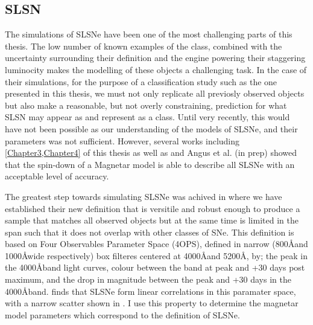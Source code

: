 \subsection{SLSN}
The simulations of SLSNe have been one of the most challenging parts of this thesis. The low number of known examples of the class, combined with the uncertainty surrounding their definition and the engine powering their staggering luminocity makes the modelling of these objects a challenging task. In the case of their simulations, for the purpose of a classification study such as the one presented in this thesis, we must not only replicate all previosly observed objects but also make a reasonable, but not overly constraining, prediction for what SLSN may appear as and represent as a class. Until very recently, this would have not been possible as our understanding of the models of SLSNe, and their parameters was not sufficient. However, several works including \cref{Chapter3,Chapter4} of this thesis as well as \citet{Inserra2013,Nicoll2013,Nicoll2017} and Angus et al. (in prep) showed that the spin-down of a Magnetar model is able to describe all SLSNe with an acceptable level of accuracy.

The greatest step towards simulating SLSNe was achived in \citet{Inserra2018a} where we have established their new definition that is versitile and robust enough to produce a sample that matches all observed objects but at the same time is limited in the span such that it does not overlap with other classes of SNe. This definition is based on Four Observables Parameter Space (4OPS), defined in narrow (800\AA and 1000\AA wide respectively) box filteres centered at 4000\AA and 5200\AA, by; the peak in the 4000\AA band light curves, colour between the band at peak and +30 days post maximum, and the drop in magnitude between the peak and +30 days in the 4000\AA band. \citet{Inserra2018a} finds that SLSNe form linear correlations in this paramater space, with a narrow scatter shown in . I use this property to determine the magnetar model parameters which correspond to the definition of SLSNe.

\begin{figure}
  \caption{}
  \label{fig:4OPS}
\end{figure}

